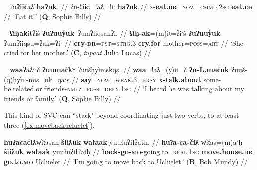 \ex~ \label{ex:eateat}
\begingl
\glpreamble ʔu\textbf{ʔiic̓}aƛ̓ \textbf{haʔuk}. //
\gla ʔu-\textbf{!iic}=!aƛ=!iˑ \textbf{haʔuk} //
\glb \textsc{x}-\textbf{eat.\textsc{dr}}=\textsc{now}=\textsc{cmmd.2sg} \textbf{eat.\textsc{dr}} //
\glft `Eat it!' (\textbf{Q}, Sophie Billy) //
\endgl
\xe

\ex~ \label{ex:crycry}
\begingl
\glpreamble \textbf{ʕiḥak}itʔiš \textbf{ʔuʔuuy̓uk}\footnotemark\ ʔumʔiiqsakʔi. //
\gla \textbf{ʕiḥ-ak}=(m)it=ʔiˑš \textbf{ʔuʔuuy̓uk} ʔumʔiiqsu=ʔak=ʔiˑ //
\glb \textbf{cry-\textsc{dr}}=\textsc{pst}=\textsc{strg.3} \textbf{cry.for} mother=\textsc{poss}=\textsc{art} //
\glft `She cried for her mother.' (\textbf{C}, \textit{tupaat} Julia Lucas) //
\endgl
\xe


\ex~ \label{ex:sayabout}
\begingl
\glpreamble \textbf{waa}ʔaƛiič \textbf{ʔuumac̓kʷ} ʔuušḥy̓imskqs. //
\gla \textbf{waa}=!aƛ=(y)ii=č \textbf{ʔu-L.mac̓uk} ʔuuš-(q)ḥy̓uˑ-mis=uk=qaˑs //
\glb \textbf{say}=\textsc{now}=\textsc{weak.3}=\textsc{hrsy} \textbf{\textsc{x}-talk.about} some-be.related.or.friends-\textsc{nmlz}=\textsc{poss}=\textsc{defn.1sg} //
\glft `I heard he was talking about my friends or family.' (\textbf{Q}, Sophie Billy) //
\endgl
\xe

This kind of SVC can ``stack" beyond coordinating just two verbs, to at least three (\ref{ex:movebackucluelet}).

\begin{comment}
\ex \label{ex:onlygotostore}
\begingl
\glpreamble \textbf{ʔanasiła}ʔi \textbf{kuw̓iła} \textbf{ʔucačiƛ} makuwił. //
\gla \textbf{ʔana-siła}=!iˑ \textbf{kuw̓iła} \textbf{ʔu-ca-čiƛ} makuwił //
\glb \textbf{only-do}=\textsc{cmmd.2sg} \textbf{go.ahead} \textbf{\textsc{x}-go.to-\textsc{mo}} store //
\glft `Just go to the store.' (\textbf{C}, \textit{tupaat} Julia Lucas) //
\endgl
\xe
\end{comment}

\ex \label{ex:movebackucluelet}
\begingl
\glpreamble \textbf{huʔacačiƛ}w̓it̓asaḥ \textbf{šiiƛuk} \textbf{wałaak} yuułuʔiłʔatḥ. //
\gla \textbf{huʔa-ca-čiƛ}-w̓it̓as=(m)aˑḥ \textbf{šiiƛuk} \textbf{wałaak} yuułuʔiłʔatḥ //
\glb \textbf{back-go-\textsc{mo}}-going.to=\textsc{real.1sg} \textbf{move.house.\textsc{dr}} \textbf{go.to.\textsc{mo}} Ucluelet //
\glft `I'm going to move back to Ucluelet.' (\textbf{B}, Bob Mundy) //
\endgl
\xe

